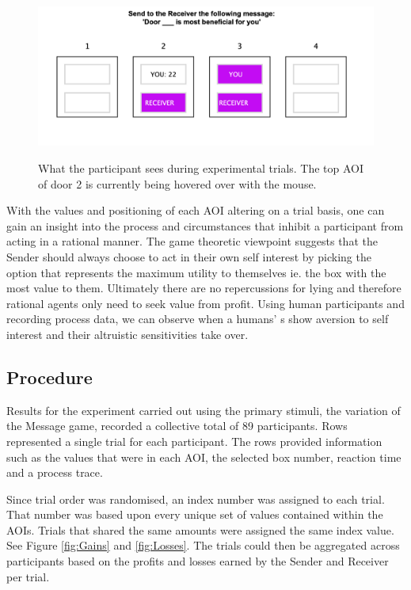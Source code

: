 \documentclass[man, floatsintext]{apa7}
\begin{document}
\begin{figure}[H]
	\centering
	\includegraphics[width=0.75\linewidth]{figures/HIDDEN.png}
	\label{fig:HiddenAOIs}
	\caption{What the participant sees during experimental trials. The top AOI of door 2 is currently being hovered over with the mouse.}
\end{figure}

With the values and positioning of each AOI altering on a trial basis, one can gain an insight into the process and circumstances that inhibit a participant from acting in a rational manner. The game theoretic viewpoint suggests that the Sender should always choose to act in their own self interest by picking the option that represents the maximum utility to themselves ie. the box with the most value to them. Ultimately there are no repercussions for lying and therefore rational agents only need to seek value from profit. Using human participants and recording process data, we can observe when a humans' s show aversion to self interest and their altruistic sensitivities take over.

\subsection{Procedure}

Results for the experiment carried out using the primary stimuli, the variation of the Message game, recorded a collective total of 89 participants. Rows represented a single trial for each participant. The rows provided information such as the values that were in each AOI, the selected box number, reaction time and a process trace.

Since trial order was randomised, an index number was assigned to each trial. That number was based upon every unique set of values contained within the AOIs. Trials that shared the same amounts were assigned the same index value. See Figure \ref{fig:Gains} and \ref{fig:Losses}. The trials could then be aggregated across participants based on the profits and losses earned by the Sender and Receiver per trial.
\end{document}
